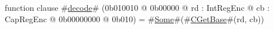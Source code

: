function clause #\hyperref[zdecode]{decode}# (0b010010 @ 0b00000 @ rd : IntRegEnc @ cb : CapRegEnc @ 0b00000000 @ 0b010) = #\hyperref[zSome]{Some}#(#\hyperref[zCGetBase]{CGetBase}#(rd, cb))
